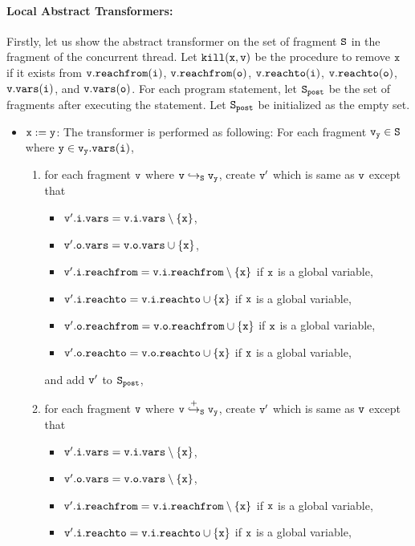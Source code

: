 \paragraph{Local Abstract Transformers:} Firstly, let us show the abstract transformer on the set of fragment $\tt S$ in the fragment of the concurrent thread. Let $\tt kill(x,v)$ be the procedure to remove $\tt x$ if it exists from $\tt v.{\tt reachfrom}(\tt i)$, $\tt v.{\tt reachfrom}(\tt o)$, $\tt v.{\tt reachto}(\tt i)$, $\tt v.{\tt reachto}(\tt o)$, $\tt v.{\tt vars}(\tt i)$, and $\tt v.{\tt vars}(\tt o)$. For each program statement, let $\tt S_{post}$ be the set of fragments after executing the statement. Let $\tt S_{post}$ be initialized as the empty set.
\begin{itemize}

\item ${\tt x := y}$: The transformer is performed as following: For each fragment $\tt v_y \in S$ where $\tt y \in v_y.{\tt vars}(\tt i)$,
\begin{enumerate}
\item  for each fragment $\tt v$ where $\tt v \hookrightarrow_S v_y$, create $\tt v'$ which is same as $\tt v$ except that
\begin{itemize}
\item $\tt v'.i.vars = v.i.vars \setminus \{x\}$,
\item $\tt v'.o.vars = v.o.vars \cup \{x\}$,
\item $\tt v'.i.reachfrom = v.i.reachfrom \setminus \{x\}$ if $\tt x$ is a global variable,
\item $\tt v'.i.reachto = v.i.reachto \cup \{x\}$ if $\tt x$ is a global variable,
 \item $\tt v'.o.reachfrom = v.o.reachfrom \cup \{x\}$ if $\tt x$ is a global variable,
\item $\tt v'.o.reachto = v.o.reachto \cup \{x\}$ if $\tt x$ is a global variable,
\end{itemize}
and add $\tt v'$ to $\tt S_{post}$,
\item for each fragment $\tt v$ where $\tt v \overset{+}\hookrightarrow_S v_y$, create $\tt v'$ which is same as $\tt v$ except that
\begin{itemize}
\item $\tt v'.i.vars = v.i.vars \setminus \{x\}$,
\item $\tt v'.o.vars = v.o.vars \setminus \{x\}$,
\item $\tt v'.i.reachfrom = v.i.reachfrom \setminus \{x\}$ if $\tt x$ is a global variable,
\item $\tt v'.i.reachto = v.i.reachto \cup \{x\}$ if $\tt x$ is a global variable,

\end{itemize}
\end{enumerate}
\end{itemize}
